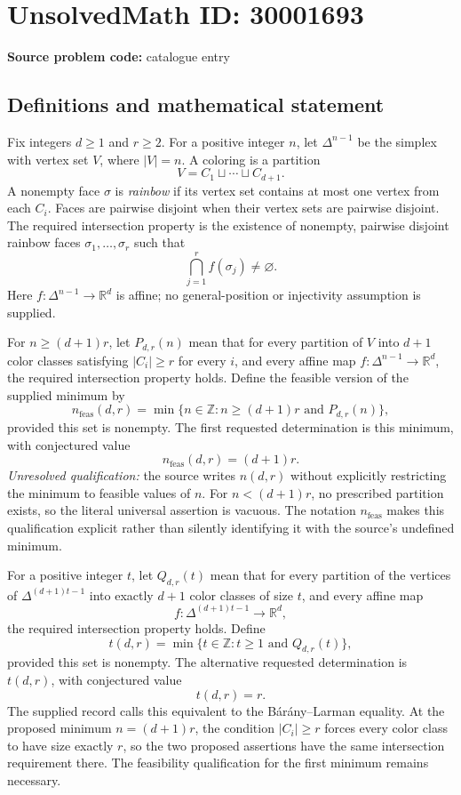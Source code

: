 \documentclass[11pt]{article}
\newcommand{\Z}{\mathbb{Z}}
\newcommand{\R}{\mathbb{R}}
\begin{document}
\section*{UnsolvedMath ID: 30001693}
\textbf{Source problem code:} catalogue entry
\subsection{Definitions and mathematical statement}
Fix integers \(d\geq 1\) and \(r\geq 2\). For a positive integer \(n\), let \(\Delta^{n-1}\) be the simplex with vertex set \(V\), where \(|V|=n\). A coloring is a partition
\[
V=C_1\sqcup\cdots\sqcup C_{d+1}.
\]
A nonempty face \(\sigma\) is \emph{rainbow} if its vertex set contains at most one vertex from each \(C_i\). Faces are pairwise disjoint when their vertex sets are pairwise disjoint. The required intersection property is the existence of nonempty, pairwise disjoint rainbow faces \(\sigma_1,\ldots,\sigma_r\) such that
\[
\bigcap_{j=1}^{r}f(\sigma_j)\neq\varnothing.
\]
Here \(f:\Delta^{n-1}\to\R^d\) is affine; no general-position or injectivity assumption is supplied.

For \(n\geq(d+1)r\), let \(P_{d,r}(n)\) mean that for every partition of \(V\) into \(d+1\) color classes satisfying \(|C_i|\geq r\) for every \(i\), and every affine map \(f:\Delta^{n-1}\to\R^d\), the required intersection property holds. Define the feasible version of the supplied minimum by
\[
n_{\mathrm{feas}}(d,r)=\min\{n\in\Z:n\geq(d+1)r\text{ and }P_{d,r}(n)\},
\]
provided this set is nonempty. The first requested determination is this minimum, with conjectured value
\[
n_{\mathrm{feas}}(d,r)=(d+1)r.
\]
\emph{Unresolved qualification:} the source writes \(n(d,r)\) without explicitly restricting the minimum to feasible values of \(n\). For \(n<(d+1)r\), no prescribed partition exists, so the literal universal assertion is vacuous. The notation \(n_{\mathrm{feas}}\) makes this qualification explicit rather than silently identifying it with the source's undefined minimum.

For a positive integer \(t\), let \(Q_{d,r}(t)\) mean that for every partition of the vertices of \(\Delta^{(d+1)t-1}\) into exactly \(d+1\) color classes of size \(t\), and every affine map
\[
f:\Delta^{(d+1)t-1}\to\R^d,
\]
the required intersection property holds. Define
\[
t(d,r)=\min\{t\in\Z:t\geq1\text{ and }Q_{d,r}(t)\},
\]
provided this set is nonempty. The alternative requested determination is \(t(d,r)\), with conjectured value
\[
t(d,r)=r.
\]
The supplied record calls this equivalent to the B\'ar\'any--Larman equality. At the proposed minimum \(n=(d+1)r\), the condition \(|C_i|\geq r\) forces every color class to have size exactly \(r\), so the two proposed assertions have the same intersection requirement there. The feasibility qualification for the first minimum remains necessary.
\end{document}

